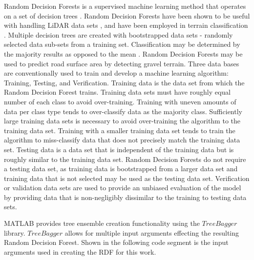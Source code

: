 \documentclass[numbered,pdftex]{ohio-etd}
\begin{document}
{{		{Random Decision Forests is a supervised machine learning method that operates on a set of decision trees \cite{ho_random_1995}. Random Decision Forests have been shown to be useful with handling LiDAR data sets \cite{breiman_random_2001}, and have been employed in terrain classification \cite{laible_3d_2012,laible_map_building,laible_terrain_2013,khan_high_2011,reymann_improving_2015,schilling_geometric_2017, wietrzykowski_context-aware_2019}. Multiple decision trees are created with bootstrapped data sets - randomly selected data sub-sets from a training set. Classification may be determined by the majority results as opposed to the mean \cite{breiman_random_2001,ho_random_1995}. Random Decision Forests may be used to predict road surface area by detecting gravel terrain. Three data bases are conventionally used to train and develop a machine learning algorithm: Training, Testing, and Verification. Training data is the data set from which the Random Decision Forest trains. Training data sets must have roughly equal number of each class to avoid over-training. Training with uneven amounts of data per class type tends to over-classify data as the majority class. Sufficiently large training data sets is necessary to avoid over-training the algorithm to the training data set. Training with a smaller training data set tends to train the algorithm to miss-classify data that does not precisely match the training data set. Testing data is a data set that is independent of the training data but is roughly similar to the training data set. Random Decision Forests do not require a testing data set, as training data is bootstrapped from a larger data set and training data that is not selected may be used as the testing data set. Verification or validation data sets are used to provide an unbiased evaluation of the model by providing data that is non-negligibly dissimilar to the training to testing data sets. }
		
		{MATLAB provides tree ensemble creation functionality using the $TreeBagger$ library. $TreeBagger$ allows for multiple input arguments effecting the resulting Random Decision Forest. Shown in the following code segment is the input arguments used in creating the RDF for this work.}

		

}}
\end{document}
